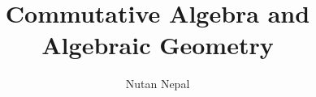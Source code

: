 
\title{Commutative Algebra and Algebraic Geometry}
\author{Nutan Nepal}



\maketitle
\section{}





